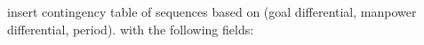 \documentclass[]{article}
\begin{document}

insert contingency table of sequences based on
(goal differential, manpower differential, period). with the following fields:
\end{document}
